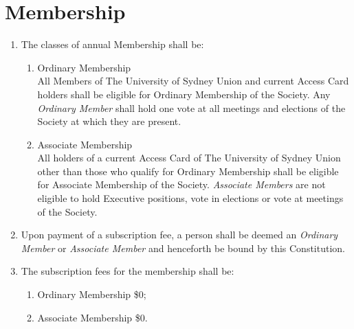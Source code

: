 \documentclass[11pt]{article}
\begin{document}
\section{Membership}
\begin{enumerate}[\thesection .1]
    \item The classes of annual Membership shall be:
    \begin{enumerate}
        \item Ordinary Membership \\ All Members of The University of Sydney Union and current Access Card holders shall be eligible for Ordinary Membership of the Society. Any \textit{Ordinary Member} shall hold one vote at all meetings and elections of the Society at which they are present.
        \item Associate Membership \\ All holders of a current Access Card of The University of Sydney Union other than those who qualify for Ordinary Membership shall be eligible for Associate Membership of the Society. \textit{Associate Members} are not eligible to hold Executive positions, vote in elections or vote at meetings of the Society.
    \end{enumerate}
    \item Upon payment of a subscription fee, a person shall be deemed an \textit{Ordinary Member} or \textit{Associate Member} and henceforth be bound by this Constitution.
    \item The subscription fees for the membership shall be:
    \begin{enumerate}
        \item Ordinary Membership \$0;
        \item Associate Membership \$0.
    \end{enumerate}
\end{enumerate}
\end{document}
